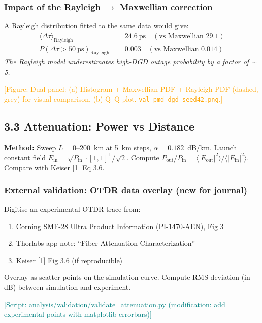 \documentclass[11pt,a4paper]{article}
\newcommand{\scriptref}[1]{\textcolor{teal}{[Script: #1]}}
\newcommand{\figref}[1]{\textcolor{orange}{[Figure: #1]}}
\begin{document}
\subsubsection*{Impact of the Rayleigh $\rightarrow$ Maxwellian correction}
A Rayleigh distribution fitted to the same data would give:
\begin{align}
  \langle\Delta\tau\rangle_{\text{Rayleigh}} &=
    24.6~\text{ps} \quad (\text{vs Maxwellian 29.1}) \\
  P(\Delta\tau > 50~\text{ps})_{\text{Rayleigh}} &=
    0.003\quad (\text{vs Maxwellian 0.014})
\end{align}
\textit{The Rayleigh model underestimates high-DGD outage probability by
a factor of $\sim$5.}

\figref{Dual panel: (a) Histogram + Maxwellian PDF + Rayleigh PDF
  (dashed, grey) for visual comparison.  (b) Q--Q plot.
  {\tt val\_pmd\_dgd--seed42.png}.}

\subsection{3.3 Attenuation: Power vs Distance}
\label{sec:val-atten}

\textbf{Method:} Sweep $L = 0$--200~km at 5~km steps, $\alpha =
0.182$~dB/km.  Launch constant field $E_{\text{in}} =
\sqrt{P_{\text{in}}} \cdot [1, 1]^\mathsf{T}/\sqrt{2}$.  Compute
$P_{\text{out}}/P_{\text{in}} = \langle|E_{\text{out}}|^2\rangle /
\langle|E_{\text{in}}|^2\rangle$.  Compare with Keiser [1] Eq 3.6.

\subsubsection*{External validation: OTDR data overlay (new for journal)}
Digitise an experimental OTDR trace from:
\begin{enumerate}[nosep]
  \item Corning SMF-28 Ultra Product Information (PI-1470-AEN), Fig 3
  \item Thorlabs app note: ``Fiber Attenuation Characterization''
  \item Keiser [1] Fig 3.6 (if reproducible)
\end{enumerate}
Overlay as scatter points on the simulation curve.  Compute RMS deviation
(in dB) between simulation and experiment.

\scriptref{analysis/validation/validate\_attenuation.py (modification:
  add experimental points with matplotlib errorbars)}
\end{document}

